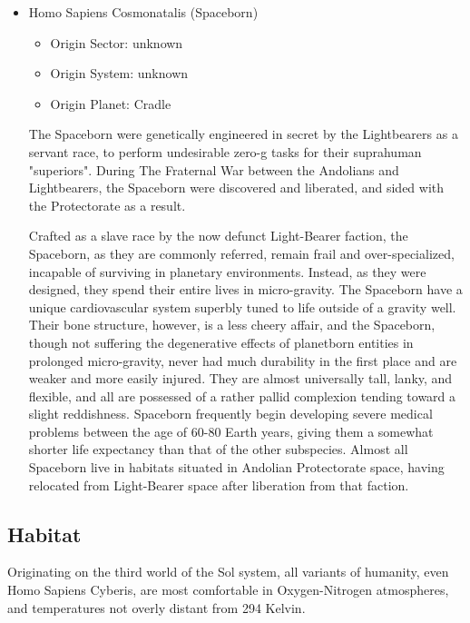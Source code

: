 \begin{itemize}
\item Homo Sapiens Cosmonatalis (Spaceborn)

\begin{itemize}
\item Origin Sector: unknown
\item Origin System: unknown
\item Origin Planet: Cradle
\end{itemize}

The Spaceborn were genetically engineered in secret by the Lightbearers as a servant race, to perform undesirable zero-g tasks for their suprahuman "superiors". During The Fraternal War between the Andolians and Lightbearers, the Spaceborn were discovered and liberated, and sided with the Protectorate as a result.

Crafted as a slave race by the now defunct Light-Bearer faction, the Spaceborn, as they are commonly referred, remain frail and over-specialized, incapable of surviving in planetary
environments. Instead, as they were designed, they spend their entire
lives in micro-gravity. The Spaceborn have a unique cardiovascular
system superbly tuned to life outside of a gravity well.  Their bone
structure, however, is a less cheery affair, and the Spaceborn, though
not suffering the degenerative effects of planetborn entities in
prolonged micro-gravity, never had much durability in the first place
and are weaker and more easily injured. They are almost universally
tall, lanky, and flexible, and all are possessed of a rather pallid
complexion tending toward a slight reddishness. Spaceborn frequently
begin developing severe medical problems between the age of 60-80
Earth years, giving them a somewhat shorter life expectancy than that
of the other subspecies.  Almost all Spaceborn live in habitats
situated in Andolian Protectorate space, having relocated from
Light-Bearer space after liberation from that faction.

\end{itemize}


\subsection{Habitat}

Originating on the third world of the Sol system, all variants of
humanity, even Homo Sapiens Cyberis, are most comfortable in
Oxygen-Nitrogen atmospheres, and temperatures not overly distant from
294 Kelvin.

